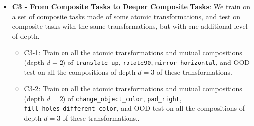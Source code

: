 \begin{itemize}
\begin{itemize}
        \item C2-2: Train on all the mutual compositions (depth $d=2$) of  \texttt{change\_object\_color}, \texttt{pad\_right}, \texttt{fill\_holes\_different\_color}, except the specific  composition $\texttt{change\_object\_color} - \texttt{pad\_right}$, which we leave for OOD testing.
        
        \item C2-3: Train on all the mutual compositions (depth $d=2$) of  \texttt{crop\_bottom\_side}, \texttt{rotate\_90}, \texttt{pad\_top}, except the specific composition $\texttt{rotate\_90} - \texttt{crop\_bottom\_side}$, which we leave for OOD testing.

        \item C2-4: Train on the mutual compositions (depth $d=2$ transformations \texttt{double\_right}, \texttt{crop\_contours}, \texttt{change\_shape\_color}, except the specific  composition $\texttt{double\_right} - \texttt{crop\_contours}$, which we leave for OOD testing.
        
        \item C2-5: Train on all the mutual compositions (depth $d=2$) of  \texttt{extend\_contours\_same\_color}, \texttt{mirror\_vertical}, \texttt{pad\_left}, except the specific composition $\texttt{pad\_left} - \texttt{extend\_contours\_same\_color}$, which we leave for OOD testing.
    \end{itemize} 
    
    \vspace{1em}
    \item \textbf{C3 - From Composite Tasks to Deeper Composite Tasks}: We train on a set of composite tasks made of some atomic transformations, and test on composite tasks with the same transformations, but with one additional level of depth.
    \begin{itemize} 
        \item C3-1: Train on all the atomic transformations and mutual compositions (depth $d=2$) of \texttt{translate\_up}, \texttt{rotate90}, \texttt{mirror\_horizontal}, and OOD test on all the compositions of depth $d=3$ of these transformations.
        
        \item C3-2: Train on all the atomic transformations and mutual compositions (depth $d=2$) of \texttt{change\_object\_color}, \texttt{pad\_right}, \texttt{fill\_holes\_different\_color}, and OOD test on all the compositions of depth $d=3$ of these transformations..
        

\end{itemize}
\end{itemize}
